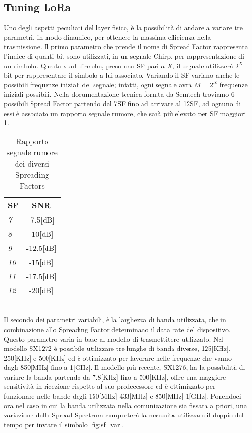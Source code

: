 \subsection{Tuning LoRa}
Uno degli aspetti peculiari del layer fisico, è la possibilità di andare a
variare tre parametri, in modo dinamico, per ottenere la massima efficienza
nella trasmissione.
Il primo parametro che prende il nome di Spread Factor 
rappresenta l'indice di quanti bit sono utilizzati, in un segnale Chirp,
per rappresentazione di un simbolo. Questo vuol dire che, preso uno 
SF pari a $X$, il segnale  utilizzerà $2^X$ bit per rappresentare il simbolo a lui
associato. Variando il SF variano anche le possibili frequenze iniziali del
segnale; infatti, ogni segnale avrà $M=2^X$ frequenze iniziali possibili.
Nella documentazione tecnica fornita da Semtech troviamo 6 possibili Spread
Factor partendo dal 7SF fino ad arrivare al 12SF, ad ognuno di essi è associato un
rapporto segnale rumore, che sarà più elevato per SF maggiori \ref{tab:SNR}. 
\begin{table}[h]
        \centering
        \begin{tabular}{l|c}
                \textbf{SF}  & SNR \\
                \hline
                \emph{7}  & -7.5[dB] \\
                \emph{8}  & -10[dB]  \\
                \emph{9}   & -12.5[dB]  \\
                \emph{10} & -15[dB] \\
                \emph{11} & -17.5[dB] \\
                \emph{12} & -20[dB] \\
        \end{tabular}
        \caption{Rapporto segnale rumore dei diversi Spreading Factors}
        \label{tab:SNR}
\end{table}
\\
Il secondo dei parametri variabili, è la larghezza di banda utilizzata, che in
combinazione allo Spreading Factor determinano il data rate del dispositivo.
Questo parametro  varia in base al modello di
trasmettitore utilizzato. Nel modello SX1272 è possibile utilizzare tre lunghe
di banda diverse, 125[KHz],
250[KHz] e 500[KHz] ed è ottimizzato per lavorare nelle frequenze che vanno
dagli  850[MHz] fino a  1[GHz]. Il modello più recente, SX1276, ha la possibilità di variare
la banda partendo da 7.8[KHz] fino a 500[KHz], offre una maggiore sensitività in
ricezione rispetto al suo predecessore ed è ottimizzato per funzionare nelle
bande degli 150[MHz] 433[MHz] e 850[MHz]-1[GHz].
Ponendoci ora nel caso in cui la banda utilizzata
nella comunicazione sia fissata a priori, una variazione dello Spread Spectrum
comporterà la necessità utilizzare il doppio del tempo per inviare il simbolo
\ref{fig:sf_var}.

